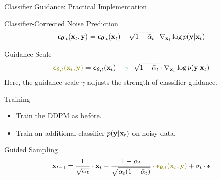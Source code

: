 \documentclass{beamer}
\begin{document}
\begin{frame}{Classifier Guidance: Practical Implementation}
	\begin{block}{Classifier-Corrected Noise Prediction}
		\vspace{-0.3cm}
		\[
			\boldsymbol{\epsilon}_{\boldsymbol{\theta}, t}(\mathbf{x}_t, \mathbf{y}) = \boldsymbol{\epsilon}_{\boldsymbol{\theta}, t}(\mathbf{x}_t) - \sqrt{1 - \bar{\alpha}_t} \cdot \nabla_{\mathbf{x}_t} \log p(\mathbf{y} | \mathbf{x}_t)
		\]
		\vspace{-0.5cm}
	\end{block}
	\begin{block}{Guidance Scale}
		\vspace{-0.3cm}
		\[
			{\color{olive}\bepsilon_{\btheta, t}(\bx_t, \by)} = \bepsilon_{\btheta, t}(\bx_t) - {\color{teal}\gamma} \cdot \sqrt{1 - \bar{\alpha}_t} \cdot \nabla_{\bx_t} \log p(\by | \bx_t)
		\]
		Here, the {\color{teal}guidance scale $\gamma$} adjusts the strength of classifier guidance.
	\end{block}
	\begin{block}{Training}
		\begin{itemize}
			\item Train the DDPM as before.
			\item Train an additional classifier $p(\mathbf{y} | \mathbf{x}_t)$ on noisy data.
		\end{itemize}
		\vspace{-0.2cm}
	\end{block}
	\begin{block}{Guided Sampling}
		\vspace{-0.3cm}
		\[
			\bx_{t-1} = \frac{1}{\sqrt{\alpha_t}} \cdot \bx_t - \frac{1 - \alpha_t}{\sqrt{\alpha_t (1 - \bar{\alpha}_t)}} \cdot  {\color{olive}\bepsilon_{\btheta, t}(\bx_t, \by)} + \sigma_t \cdot \bepsilon
		\]
	\end{block}
\end{frame}
\end{document}
